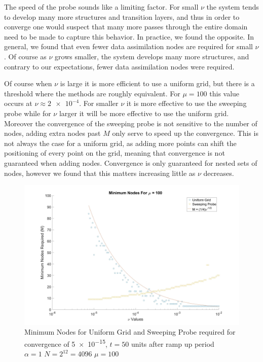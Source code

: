 \documentclass[12pt]{amsart}
\theoremstyle{plain}
\theoremstyle{definition}
\theoremstyle{remark}
\numberwithin{equation}{section} %
\numberwithin{figure}{section}   %
\begin{document}
The speed of the probe sounds like a limiting factor. For small $\nu$ the system tends to develop many more structures and transition layers, and thus in order to converge one would suspect that many more passes through the entire domain need to be made to capture this behavior. In practice, we found the opposite. In general, we found that even fewer data assimilation nodes are required for small $\nu$. Of course as $\nu$ grows smaller, the system develops many more structures, and contrary to our expectations, fewer data assimilation nodes were required.

Of course when $\nu$ is large it is more efficient to use a uniform grid, but there is a threshold where the methods are roughly equivalent. For $\mu =100$ this value occurs at $\nu \approx \num{2e-4}$. For smaller $\nu$ it is more effective to use the sweeping probe while for $\nu$ larger it will be more effective to use the uniform grid. Moreover the convergence of the sweeping probe is not sensitive to the number of nodes, adding extra nodes past $M$ only serve to speed up the convergence. This is not always the case for a uniform grid, as adding more points can shift the positioning of every point on the grid, meaning that convergence is not guaranteed when adding nodes. Convergence is only guaranteed for nested sets of nodes, however we found that this matters increasing little as $\nu$ decreases.


\begin{figure}
	\includegraphics[scale=0.15]{Minimum}
	\caption{Minimum Nodes for Uniform Grid and Sweeping Probe required for convergence of \num{5e-15}, $t=50$ units after ramp up period \\$\alpha = 1$ $N  =2^{12} = 4096$ $\mu = 100$ }
	\label{fig:min}
\end{figure}
\end{document}
